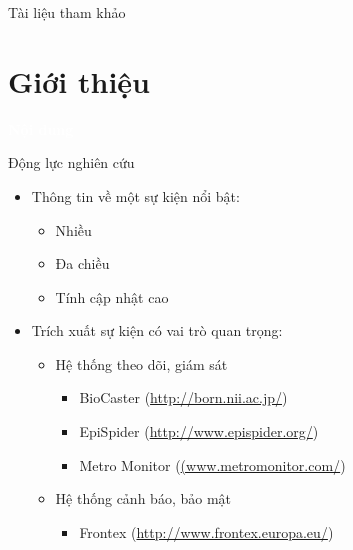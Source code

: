 \documentclass{beamer}
\numberwithin{equation}{section}
\newcommand{\trang}[1]{\textcolor{white}{#1}}
\begin{document}

\begin{frame}{Tài liệu tham khảo}


%
\end{frame}



\section{Giới thiệu}
  \begin{frame}{\trang{\LARGE \bf{Nội dung}}}
    \tableofcontents[currentsection]
  \end{frame}
    \begin{frame}{Động lực nghiên cứu}
      \begin{itemize}
        \item Thông tin về một sự kiện nổi bật:
          \begin{itemize}
            \item Nhiều
              \item Đa chiều
               \item Tính cập nhật cao
            \end{itemize}
          \medskip
          \pause
        \item Trích xuất sự kiện có vai trò quan trọng:
          \begin{itemize}
            \item Hệ thống theo dõi, giám sát
              \begin{itemize}
                \item BioCaster (\href{http://born.nii.ac.jp/}{http://born.nii.ac.jp/})
                    \item EpiSpider (\href{http://www.epispider.org/}{http://www.epispider.org/})
                      \item Metro Monitor (\href{(www.metromonitor.com/}{(www.metromonitor.com/})
                \end{itemize}
              \pause
              \item Hệ thống cảnh báo, bảo mật
                \begin{itemize}
                  \item Frontex (\href{http://www.frontex.europa.eu/}{http://www.frontex.europa.eu/})
                  \end{itemize}
          \end{itemize}
        \end{itemize}
      \end{frame}
\end{document}
